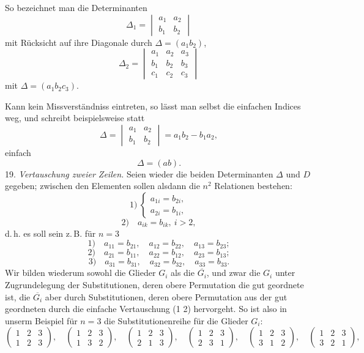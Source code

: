 \documentclass[11pt]{article}
\let\Delta\varDelta
\begin{document}
So bezeichnet man die Determinanten
\[
\Delta_1 = \begin{vmatrix} a_1 & a_2\\ b_1 & b_2 \end{vmatrix}
\]
mit Rücksicht auf ihre Diagonale durch $\Delta = (a_1 b_2)$,
\[
\Delta_2 = \begin{vmatrix} a_1 & a_2 & a_3\\ b_1 & b_2 & b_3\\ c_1 & c_2 & c_3 \end{vmatrix}
\]
mit $\Delta = (a_1 b_2 c_3)$.

Kann kein Missverständniss eintreten, so lässt man selbst die einfachen Indices weg, und schreibt beispielsweise statt
\[
\Delta = \begin{vmatrix} a_1 & a_2\\ b_1 & b_2 \end{vmatrix} = a_1 b_2 - b_1 a_2,
\]
einfach
\[
\Delta = (ab).
\]
19. \textit{Vertauschung zweier Zeilen.} Seien wieder die beiden Determinanten $\Delta$ und $D$ gegeben; zwischen den Elementen sollen alsdann die $n^2$ Relationen bestehen:
\[
1)\ \begin{cases} a_{1i} = b_{2i},\\ a_{2i} = b_{1i}, \end{cases}
\]
\[
2)\quad a_{ik} = b_{ik}, \ i>2,
\]
d.\,h. es soll sein z.\,B. für $n=3$
\[
1)\quad a_{11} = b_{21}, \quad a_{12} = b_{22}, \quad a_{13} = b_{23};
\]
\[
2)\quad a_{21} = b_{11}, \quad a_{22} = b_{12}, \quad a_{23} = b_{13};
\]
\[
3)\quad a_{31} = b_{31}, \quad a_{32} = b_{32}, \quad a_{33} = b_{33}.
\]
Wir bilden wiederum sowohl die Glieder $G_i$ als die $\overline{G_i}$, und zwar die $G_i$ unter Zugrundelegung der Substitutionen, deren obere Permutation die gut geordnete ist, die $\overline{G_i}$ aber durch Substitutionen, deren obere Permutation aus der gut geordneten durch die einfache Vertauschung (1 2) hervorgeht. So ist also in unserm Beispiel für $n=3$ die Substitutionenreihe für die Glieder $G_i$:
\[
\begin{pmatrix}1&2&3\\1&2&3\end{pmatrix}, \quad
\begin{pmatrix}1&2&3\\1&3&2\end{pmatrix}, \quad
\begin{pmatrix}1&2&3\\2&1&3\end{pmatrix}, \quad
\begin{pmatrix}1&2&3\\2&3&1\end{pmatrix}, \quad
\begin{pmatrix}1&2&3\\3&1&2\end{pmatrix}, \quad
\begin{pmatrix}1&2&3\\3&2&1\end{pmatrix},
\]
\end{document}
